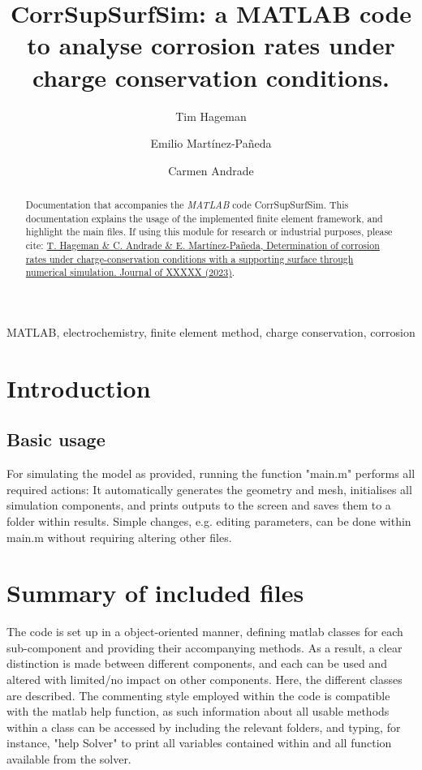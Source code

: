 \documentclass[3p]{elsarticle} %
\let\oldtodo\todo
\renewcommand{\todo}[1]{\oldtodo[inline]{#1}}
\newcommand{\citeMe}{\href{DOI HERE}{T. Hageman \& C. Andrade \& E. Martínez-Pañeda, Determination of corrosion rates under charge-conservation conditions with a supporting surface through numerical simulation. Journal of XXXXX (2023)}}
\begin{document}
\begin{frontmatter}
\title{Corr\textunderscore Sup\textunderscore Surf\textunderscore Sim: a MATLAB code to analyse corrosion rates under charge conservation conditions.}

\author[1]{Tim Hageman }
\author[1]{Emilio Martínez-Pañeda}
\author[2]{Carmen Andrade}

\address[1]{Department of Civil and Environmental Engineering, Imperial College London, London SW7 2AZ, UK}
\address[2]{International Center of Numerical Methods in Engineering (CIMNE), Madrid 28010, Spain}

\begin{abstract}
Documentation that accompanies the \textit{MATLAB} code Corr\textunderscore Sup\textunderscore Surf\textunderscore Sim. This documentation explains the usage of the implemented finite element framework, and highlight the main files. If using this module for research or industrial purposes, please cite: \citeMe{}.
\end{abstract}

\begin{keyword}
MATLAB, electrochemistry, finite element method, charge conservation, corrosion
\end{keyword}

\end{frontmatter}

\tableofcontents

\section{Introduction}
\todo{Intro}

\subsection{Basic usage}
For simulating the model as provided, running the function "main.m" performs all required actions: It automatically generates the geometry and mesh, initialises all simulation components, and prints outputs to the screen and saves them to a folder within results. Simple changes, e.g. editing parameters, can be done within main.m without requiring altering other files. 

\section{Summary of included files}
The code is set up in a object-oriented manner, defining matlab classes for each sub-component and providing their accompanying methods. As a result, a clear distinction is made between different components, and each can be used and altered with limited/no impact on other components. Here, the different classes are described. The commenting style employed within the code is compatible with the matlab help function, as such information about all usable methods within a class can be accessed by including the relevant folders, and typing, for instance, "help Solver" to print all variables contained within and all function available from the solver. 
\end{document}
